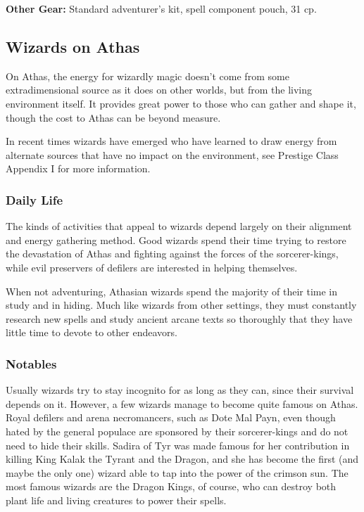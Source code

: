 \textbf{Other Gear:} Standard adventurer's kit, spell component pouch, 31 cp.

\subsection{Wizards on Athas}

On Athas, the energy for wizardly magic doesn't come from some extradimensional source as it does on other worlds, but from the living environment itself. It provides great power to those who can gather and shape it, though the cost to Athas can be beyond measure.

In recent times wizards have emerged who have learned to draw energy from alternate sources that have no impact on the environment, see Prestige Class Appendix I for more information.

\subsubsection{Daily Life}
The kinds of activities that appeal to wizards depend largely on their alignment and energy gathering method. Good wizards spend their time trying to restore the devastation of Athas and fighting against the forces of the sorcerer-kings, while evil preservers of defilers are interested in helping themselves.

When not adventuring, Athasian wizards spend the majority of their time in study and in hiding. Much like wizards from other settings, they must constantly research new spells and study ancient arcane texts so thoroughly that they have little time to devote to other endeavors.

\subsubsection{Notables}
Usually wizards try to stay incognito for as long as they can, since their survival depends on it. However, a few wizards manage to become quite famous on Athas. Royal defilers and arena necromancers, such as Dote Mal Payn, even though hated by the general populace are sponsored by their sorcerer-kings and do not need to hide their skills. Sadira of Tyr was made famous for her contribution in killing King Kalak the Tyrant and the Dragon, and she has become the first (and maybe the only one) wizard able to tap into the power of the crimson sun. The most famous wizards are the Dragon Kings, of course, who can destroy both plant life and living creatures to power their spells.

